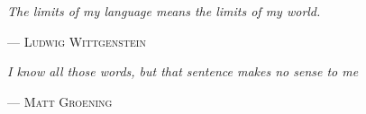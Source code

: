 \newpage
\thispagestyle{empty}
\begin{flushright}
\null
\vfill
\textit{The limits of my language means the limits of my world.}

\medskip
\textsc{--- Ludwig Wittgenstein}
\vspace{2\baselineskip}


\textit{I know all those words, but that sentence makes no sense to me}

\medskip
\textsc{--- Matt Groening}
\vspace{2\baselineskip}
\end{flushright}
\newpage
